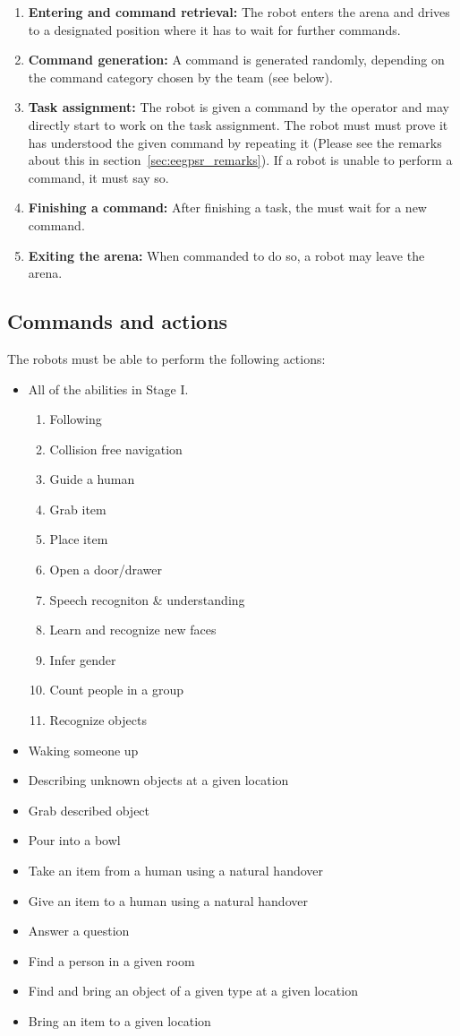 \begin{enumerate}
	\item \textbf{Entering and command retrieval:} The robot enters the arena and drives to a designated position where it has to wait for further commands.
	\item \textbf{Command generation:} A command is generated randomly, depending on the command category chosen by the team (see below).
	\item \textbf{Task assignment:} The robot is given a command by the operator and may directly start to work on the task assignment. 
	The robot must must prove it has understood the given command by repeating it (Please see the remarks about this in section~\ref{sec:eegpsr_remarks}).
	If a robot is unable to perform a command, it must say so. 
	\item \textbf{Finishing a command:} After finishing a task, the must wait for a new command.
	\item \textbf{Exiting the arena:} When commanded to do so, a robot may leave the arena. 
\end{enumerate}

\subsection{Commands and actions}


The robots must be able to perform the following actions:
\begin{itemize}
 \item All of the abilities in Stage I.
  \begin{enumerate}
   \item Following
   \item Collision free navigation
   \item Guide a human
   \item Grab item
   \item Place item
   \item Open a door/drawer
   \item Speech recogniton \& understanding
   \item Learn and recognize new faces
   \item Infer gender
   \item Count people in a group
   \item Recognize objects
  \end{enumerate}
 \item Waking someone up
 \item Describing unknown objects at a given location
 \item Grab described object
 \item Pour into a bowl
 \item Take an item from a human using a natural handover
 \item Give an item to a human using a natural handover
 \item Answer a question
 \item Find a person in a given room
 \item Find and bring an object of a given type at a given location
 \item Bring an item to a given location
\end{itemize}


